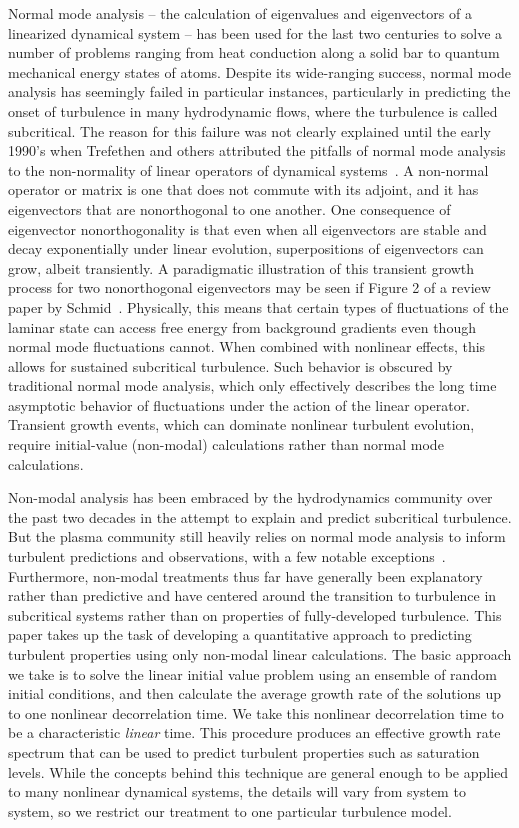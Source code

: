 \documentclass[showpacs,preprintnumbers,amsmath,amssymb,superscriptaddress,aip]{revtex4-1}
\begin{document}
Normal mode analysis -- the calculation of eigenvalues and eigenvectors of a linearized dynamical system -- has been used for the last two centuries to solve a number of problems ranging from
heat conduction along a solid bar to quantum mechanical energy states of atoms. Despite its wide-ranging success, normal mode analysis has seemingly failed in particular instances,
particularly in predicting the onset of turbulence in many hydrodynamic flows, where the turbulence is called subcritical. 
The reason for this failure was not clearly explained until the early 1990's when Trefethen and others attributed the pitfalls of normal mode analysis to the non-normality of linear operators of
dynamical systems~\cite{trefethen1993,trefethen2005}. A non-normal operator or matrix is one that does not commute with its adjoint, and it has 
eigenvectors that are nonorthogonal to one another. One consequence of eigenvector nonorthogonality is that even when all eigenvectors are stable and decay exponentially under linear evolution, 
superpositions of eigenvectors can grow, albeit transiently.
A paradigmatic illustration of this transient growth process for two nonorthogonal eigenvectors may be seen if Figure 2 of a review paper by Schmid~\cite{schmid2007}.
Physically, this means that certain types of fluctuations of the laminar state can access free energy from background gradients even though normal mode fluctuations cannot.
When combined with nonlinear effects, this allows for sustained subcritical turbulence.
Such behavior is obscured by traditional normal mode analysis, which only effectively describes the long time asymptotic behavior of fluctuations under the 
action of the linear operator. Transient growth events, which can dominate nonlinear turbulent evolution, require initial-value (non-modal) calculations rather than normal mode calculations.

Non-modal analysis has been embraced by the hydrodynamics community over the past two decades in the attempt to explain and predict subcritical turbulence. But the plasma community
still heavily relies on normal mode analysis to inform turbulent predictions and observations, with a few notable exceptions~\cite{camargo1998,camporeale2010,schekochihin2012}. 
Furthermore, non-modal treatments thus far have generally been explanatory rather than predictive and have centered around the transition to turbulence in subcritical systems rather 
than on properties of fully-developed turbulence.
This paper takes up the task of developing a quantitative approach to predicting turbulent properties using only non-modal linear calculations. 
The basic approach we take is to solve the linear initial value problem using an ensemble of random initial conditions, 
and then calculate the average growth rate of the solutions up to one nonlinear decorrelation time. We take this nonlinear decorrelation time to be a characteristic \emph{linear} time.
This procedure produces an effective growth rate spectrum that can be used to predict turbulent properties such as saturation levels.
While the concepts behind this technique are general enough to be applied to many nonlinear dynamical systems, the details will vary from system to system, 
so we restrict our treatment to one particular turbulence model.
\end{document}
